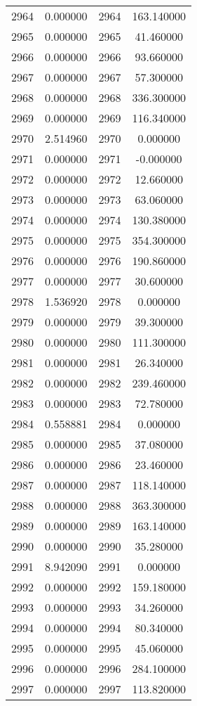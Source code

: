 \documentclass[12pt]{article}
\begin{document}
\begin{longtable}{@{}cccc@{}}
2964 & 0.000000 & 2964 & 163.140000 \\
2965 & 0.000000 & 2965 & 41.460000 \\
2966 & 0.000000 & 2966 & 93.660000 \\
2967 & 0.000000 & 2967 & 57.300000 \\
2968 & 0.000000 & 2968 & 336.300000 \\
2969 & 0.000000 & 2969 & 116.340000 \\
2970 & 2.514960 & 2970 & 0.000000 \\
2971 & 0.000000 & 2971 & -0.000000 \\
2972 & 0.000000 & 2972 & 12.660000 \\
2973 & 0.000000 & 2973 & 63.060000 \\
2974 & 0.000000 & 2974 & 130.380000 \\
2975 & 0.000000 & 2975 & 354.300000 \\
2976 & 0.000000 & 2976 & 190.860000 \\
2977 & 0.000000 & 2977 & 30.600000 \\
2978 & 1.536920 & 2978 & 0.000000 \\
2979 & 0.000000 & 2979 & 39.300000 \\
2980 & 0.000000 & 2980 & 111.300000 \\
2981 & 0.000000 & 2981 & 26.340000 \\
2982 & 0.000000 & 2982 & 239.460000 \\
2983 & 0.000000 & 2983 & 72.780000 \\
2984 & 0.558881 & 2984 & 0.000000 \\
2985 & 0.000000 & 2985 & 37.080000 \\
2986 & 0.000000 & 2986 & 23.460000 \\
2987 & 0.000000 & 2987 & 118.140000 \\
2988 & 0.000000 & 2988 & 363.300000 \\
2989 & 0.000000 & 2989 & 163.140000 \\
2990 & 0.000000 & 2990 & 35.280000 \\
2991 & 8.942090 & 2991 & 0.000000 \\
2992 & 0.000000 & 2992 & 159.180000 \\
2993 & 0.000000 & 2993 & 34.260000 \\
2994 & 0.000000 & 2994 & 80.340000 \\
2995 & 0.000000 & 2995 & 45.060000 \\
2996 & 0.000000 & 2996 & 284.100000 \\
2997 & 0.000000 & 2997 & 113.820000 \\

\end{longtable}
\end{document}

